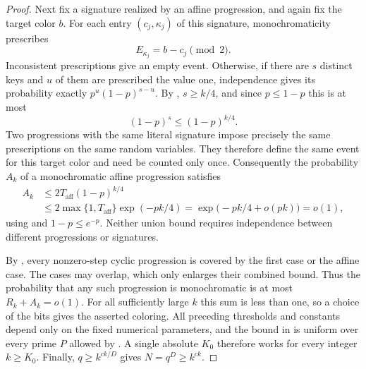 \begin{proof}
Next fix a signature realized by an affine progression, and again fix
the target color $b$.  For each entry $(c_j,\kappa_j)$ of this
signature, monochromaticity prescribes
\[
 E_{\kappa_j}=b-c_j\pmod2.
\]
Inconsistent prescriptions give an empty event.  Otherwise, if there
are $s$ distinct keys and $u$ of them are prescribed the value one,
independence gives its probability exactly
$p^u(1-p)^{s-u}$.  By , $s\ge k/4$, and
since $p\le1-p$ this is at most
\[
 (1-p)^s\le(1-p)^{k/4}.
\]
Two progressions with the same literal signature impose precisely the
same prescriptions on the same random variables.  They therefore
define the same event for this target color and need be counted only
once.  Consequently the probability $A_k$ of a monochromatic affine
progression satisfies
\begin{equation}\label{perturb:affine-bound}
 \begin{aligned}
 A_k&\le2T_{\mathrm{aff}}(1-p)^{k/4}\\
 &\le2\max\{1,T_{\mathrm{aff}}\}\exp(-pk/4)
   =\exp\bigl(-pk/4+o(pk)\bigr)=o(1),
 \end{aligned}
\end{equation}
using  and $1-p\le e^{-p}$.
Neither union bound requires independence between different
progressions or signatures.

By , every nonzero-step cyclic progression is
covered by the first case or the affine case.  The cases may overlap,
which only enlarges their combined bound.  Thus the probability that
any such progression is monochromatic is at most $R_k+A_k=o(1)$.
For all sufficiently large $k$ this sum is less than one, so a choice
of the bits gives the asserted coloring.  All preceding thresholds and
constants depend only on the fixed numerical parameters, and the
bound in  is uniform over every prime $P$
allowed by . A single absolute $K_0$ therefore works for
every integer $k\ge K_0$.  Finally, $q\ge k^{ck/D}$ gives
$N=q^D\ge k^{ck}$.
\end{proof}
